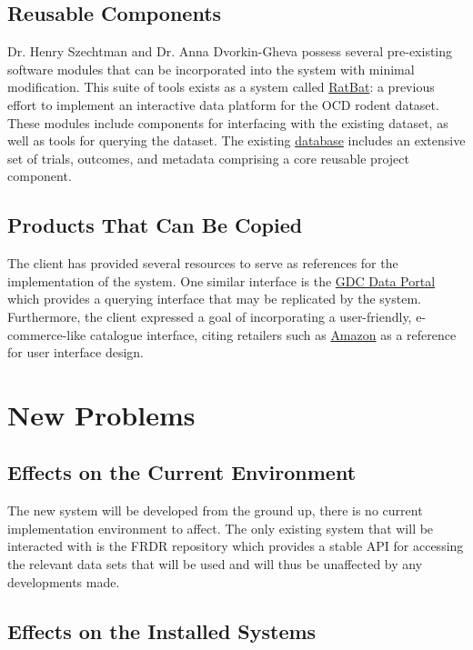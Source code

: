 \documentclass[12pt]{article}
\begin{document}
\subsection{Reusable Components}

Dr. Henry Szechtman and Dr. Anna Dvorkin-Gheva possess several pre-existing software modules that can be incorporated into the system with minimal modification. This suite of tools exists as a system called \href{https://github.com/brandonc-edu/RatBAT/tree/main}{RatBat}: a previous effort to implement an interactive data platform for the OCD rodent dataset. These modules include components for interfacing with the existing dataset, as well as tools for querying the dataset. The existing \href{https://doi.org/10.1093/gigascience/giac092}{database} includes an extensive set of trials, outcomes, and metadata comprising a core reusable project component.

\subsection{Products That Can Be Copied}


The client has provided several resources to serve as references for the implementation of the system. One similar interface is the \href{https://portal.gdc.cancer.gov/analysis_page?app=CohortBuilder&tab=general_diagnosis}{GDC Data Portal} which provides a querying interface that may be replicated by the system. Furthermore, the client expressed a goal of incorporating a user-friendly, e-commerce-like catalogue interface, citing retailers such as \href{https://amazon.ca}{Amazon} as a reference for user interface design. 


\section{New Problems}
\subsection{Effects on the Current Environment}

The new system will be developed from the ground up, there is no current implementation environment to affect. The only existing system that will be interacted with is the FRDR repository which provides
a stable API for accessing the relevant data sets that will be used and will thus be unaffected by any developments made.

\subsection{Effects on the Installed Systems}
\end{document}

